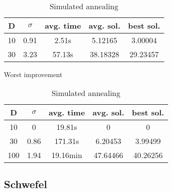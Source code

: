 \documentclass{article}
\begin{document}
\begin{table}[!htbp]
\begin{minipage}{.4\linewidth}
    \centering

    \begin{tabular}{|c|c|c|c|c|}
    \hline
    D   & $\sigma$  & avg. time     & avg. sol.     & best sol. \\
    \hline
    10  & 0.91      & 2.51s         & 5.12165       & 3.00004 \\
    \hline
    30  & 3.23      & 57.13s        & 38.18328      & 29.23457 \\
    \hline
    \end{tabular}
    \caption{Worst improvement}
  \end{minipage}%
  \quad %
  \begin{minipage}{.75\linewidth}
    \centering

    \begin{tabular}{|c|c|c|c|c|}
    \hline
    D   & $\sigma$  & avg. time     & avg. sol.     & best sol. \\
    \hline
    10  & 0         & 19.81s        & 0       & 0 \\
    \hline
    30  & 0.86      & 171.31s       & 6.20453       & 3.99499 \\
    \hline
    100 & 1.94      & 19.16min      & 47.64466      & 40.26256 \\
    \hline
    \end{tabular}
    \caption{Simulated annealing}
  \end{minipage}
\end{table}

\newpage
\setcounter{table}{0}


\subsection{Schwefel}
\end{document}
